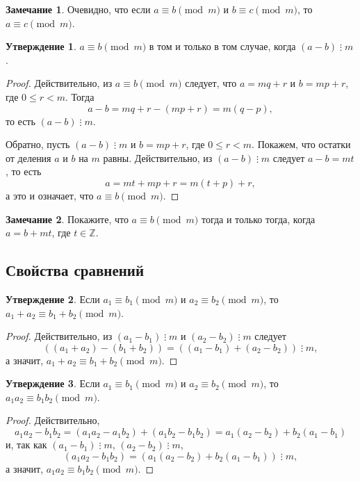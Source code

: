 \documentclass[14pt, a4paper]{extarticle}
\theoremstyle{definition}
\newtheorem*{remark}{Замечание}
\newtheorem{statement}{Утверждение}
\newcommand{\divisible}{\mathop{\vdots}}
\begin{document}
	\begin{remark}
		Очевидно, что если $a\equiv b\pmod{m}$ и $b\equiv c\pmod{m}$, то $a\equiv c\pmod{m}$.
	\end{remark}

	\begin{statement}
		$a\equiv b\pmod{m}$ в том и только в том случае, когда $(a-b)\divisible m$.
	\end{statement}
	\begin{proof}
		Действительно, из $a\equiv b\pmod{m}$ следует, что \mbox{$a=mq+r$} и $b=mp+r$, где $0\leqslant r<m$. Тогда $$a-b=mq+r-(mp+r)=m(q-p),$$ то есть $(a-b)\divisible m$.
		
		Обратно, пусть $(a-b)\divisible m$ и $b=mp+r$, где $0\leqslant r<m$. Покажем, что остатки от деления $a$ и $b$ на $m$ равны. Действительно, из $(a-b)\divisible m$ следует $a-b=mt$, то есть $$a=mt+mp+r=m(t+p)+r,$$ а это и означает, что $a\equiv b\pmod{m}$.
	\end{proof}

	\begin{remark}
		Покажите, что $a\equiv b\pmod{m}$ тогда и только тогда, когда $a=b+mt$, где $t\in\mathbb{Z}$.
	\end{remark}

\subsection{Свойства сравнений}
\label{prop}

	\begin{statement}
		Если $a_1\equiv b_1\pmod{m}$ и $a_2\equiv b_2\pmod{m}$, то $a_1+a_2\equiv b_1+b_2\pmod{m}$.
	\end{statement}
	\begin{proof}
		Действительно, из $(a_1-b_1)\divisible m$ и $(a_2-b_2)\divisible m$ следует $$((a_1+a_2)-(b_1+b_2))=((a_1-b_1)+(a_2-b_2))\divisible m,$$ а значит, $a_1+a_2\equiv b_1+b_2\pmod{m}$.
	\end{proof}

	\begin{statement}
	\label{mult}
		Если $a_1\equiv b_1\pmod{m}$ и $a_2\equiv b_2\pmod{m}$, то $a_1a_2\equiv b_1b_2\pmod{m}$.
	\end{statement}
	\begin{proof}
		Действительно, $$a_1a_2-b_1b_2=(a_1a_2-a_1b_2)+(a_1b_2-b_1b_2)=a_1(a_2-b_2)+b_2(a_1-b_1)$$ и, так как $(a_1-b_1)\divisible m$, $(a_2-b_2)\divisible m$, $$(a_1a_2-b_1b_2)=(a_1(a_2-b_2)+b_2(a_1-b_1))\divisible m,$$ а значит, $a_1a_2\equiv b_1b_2\pmod{m}$.
	\end{proof}
\end{document}
